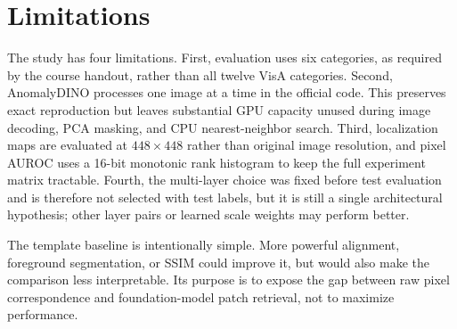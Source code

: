 \section{Limitations}

The study has four limitations. First, evaluation uses six categories, as
required by the course handout, rather than all twelve VisA categories.
Second, AnomalyDINO processes one image at a time in the official code. This
preserves exact reproduction but leaves substantial GPU capacity unused during
image decoding, PCA masking, and CPU nearest-neighbor search. Third,
localization maps are evaluated at $448\times448$ rather than original image
resolution, and pixel AUROC uses a 16-bit monotonic rank histogram to keep the
full experiment matrix tractable. Fourth, the
multi-layer choice was fixed before test evaluation and is therefore not
selected with test labels, but it is still a single architectural hypothesis;
other layer pairs or learned scale weights may perform better.

The template baseline is intentionally simple. More powerful alignment,
foreground segmentation, or SSIM could improve it, but would also make the
comparison less interpretable. Its purpose is to expose the gap between raw
pixel correspondence and foundation-model patch retrieval, not to maximize
performance.
